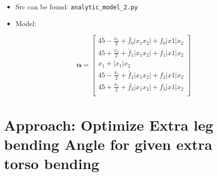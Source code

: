 \documentclass[10pt,a4paper]{article}
\begin{document}
\begin{itemize}

\item Src can be found: \texttt{analytic\_model\_2.py}

\item Model:

\begin{equation}
\bm{\alpha} = \begin{bmatrix}
45 - \frac{x_1}{2} + \bar{f}_0|x_1x_2| + f_0|x1|x_2 \\
45 + \frac{x_1}{2} + \bar{f}_1|x_1x_2| + f_1|x1|x_2 \\
x_1 + |x_1|x_2 \\
45 - \frac{x_1}{2} + \bar{f}_2|x_1x_2| + f_2|x1|x_2 \\
45 + \frac{x_1}{2} + \bar{f}_3|x_1x_2| + f_3|x1|x_2 \\
\end{bmatrix}
\end{equation}

\end{itemize}

\section{Approach: Optimize Extra leg bending Angle for given extra torso bending}
\end{document}
